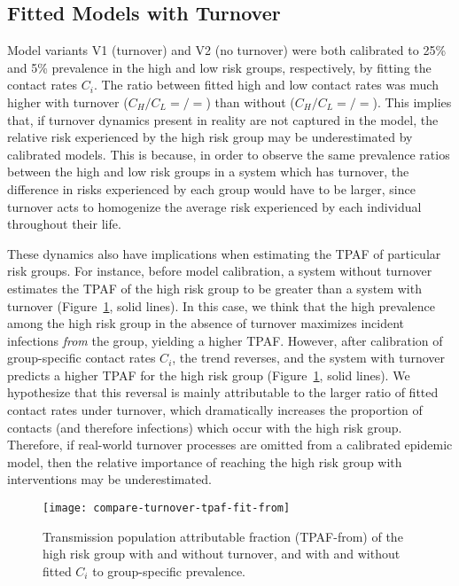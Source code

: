 \subsection{Fitted Models with Turnover}\label{ss:res-turnover-fit}
Model variants V1 (turnover) and V2 (no turnover) were both calibrated to
25\% and 5\% prevalence in the high and low risk groups, respectively,
by fitting the contact rates $C_i$.
The ratio between fitted high and low contact rates was much higher with turnover
($C_H / C_L = 
 /
 =
$)
than without
($C_H / C_L =
 /
 =
$).
This implies that, if turnover dynamics present in reality are not captured in the model,
the relative risk experienced by the high risk group
may be underestimated by calibrated models.
This is because, in order to observe
the same prevalence ratios between the high and low risk groups
in a system which has turnover,
the difference in risks experienced by each group would have to be larger,
since turnover acts to homogenize
the average risk experienced by each individual throughout their life.
\par
These dynamics also have implications
when estimating the TPAF of particular risk groups.
For instance, before model calibration, a system without turnover
estimates the TPAF of the high risk group to be greater than a system with turnover
(Figure~\ref{fig:tpaf-fit-from}, solid lines).
In this case, we think that
the high prevalence among the high risk group in the absence of turnover
maximizes incident infections \textit{from} the group,
yielding a higher TPAF.
However, after calibration of group-specific contact rates $C_i$,
the trend reverses, and the system with turnover predicts
a higher TPAF for the high risk group
(Figure~\ref{fig:tpaf-fit-from}, solid lines).
We hypothesize that this reversal is mainly attributable to
the larger ratio of fitted contact rates under turnover,
which dramatically increases the proportion of contacts (and therefore infections)
which occur with the high risk group.
Therefore, if real-world turnover processes are omitted from a calibrated epidemic model,
then the relative importance of reaching the high risk group with interventions
may be underestimated.
\begin{figure}
  \centering
  \texttt{[image: compare-turnover-tpaf-fit-from]}
  \caption{Transmission population attributable fraction (TPAF-from)
    of the high risk group with and without turnover,
    and with and without fitted $C_i$ to group-specific prevalence.}
  \label{fig:tpaf-fit-from}
\end{figure}